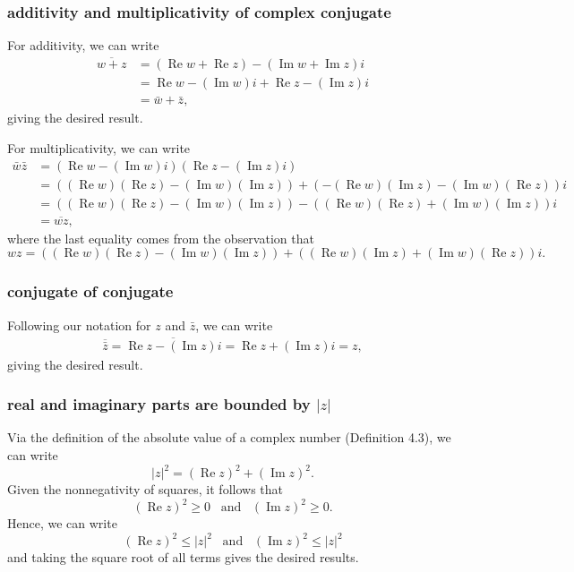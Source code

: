 \documentclass{article}
\begin{document}
\subsubsection*{additivity and multiplicativity of complex conjugate}
For additivity, we can write
\begin{align*}
    \overline{w+z}&=(\operatorname{Re}w+\operatorname{Re}z)-(\operatorname{Im}w+\operatorname{Im}z)i\\
    &=\operatorname{Re}w-(\operatorname{Im}w)i+\operatorname{Re}z-(\operatorname{Im}z)i\\
    &=\bar{w}+\bar{z},
\end{align*}
giving the desired result.

For multiplicativity, we can write
\begin{align*}
    \bar{w}\bar{z}&=(\operatorname{Re}w-(\operatorname{Im}w)i)(\operatorname{Re}z-(\operatorname{Im}z)i)\\
    &=((\operatorname{Re}w)(\operatorname{Re}z)-(\operatorname{Im}w)(\operatorname{Im}z))+(-(\operatorname{Re}w)(\operatorname{Im}z)-(\operatorname{Im}w)(\operatorname{Re}z))i\\
    &=((\operatorname{Re}w)(\operatorname{Re}z)-(\operatorname{Im}w)(\operatorname{Im}z))-((\operatorname{Re}w)(\operatorname{Re}z)+(\operatorname{Im}w)(\operatorname{Im}z))i\\
    &=\overline{wz},
\end{align*}
where the last equality comes from the observation that
\[wz=((\operatorname{Re}w)(\operatorname{Re}z)-(\operatorname{Im}w)(\operatorname{Im}z))+((\operatorname{Re}w)(\operatorname{Im}z)+(\operatorname{Im}w)(\operatorname{Re}z))i.\]

\subsubsection*{conjugate of conjugate}
Following our notation for $z$ and $\bar{z}$, we can write
\begin{align*}
    \overline{\bar{z}}=\overline{\operatorname{Re}z-(\operatorname{Im}z)i}=\operatorname{Re}z+(\operatorname{Im}z)i=z,
\end{align*}
giving the desired result.

\subsubsection*{real and imaginary parts are bounded by $|z|$}
Via the definition of the absolute value of a complex number (Definition 4.3), we can write
\[|z|^2=(\operatorname{Re}z)^2+(\operatorname{Im}z)^2.\]
Given the nonnegativity of squares, it follows that 
\[(\operatorname{Re}z)^2\geq 0\;\;\;\text{and}\;\;\;(\operatorname{Im}z)^2\geq 0.\]
Hence, we can write
\[(\operatorname{Re}z)^2\leq |z|^2 \;\;\;\text{and}\;\;\;(\operatorname{Im}z)^2\leq |z|^2\]
and taking the square root of all terms gives the desired results.
\end{document}
